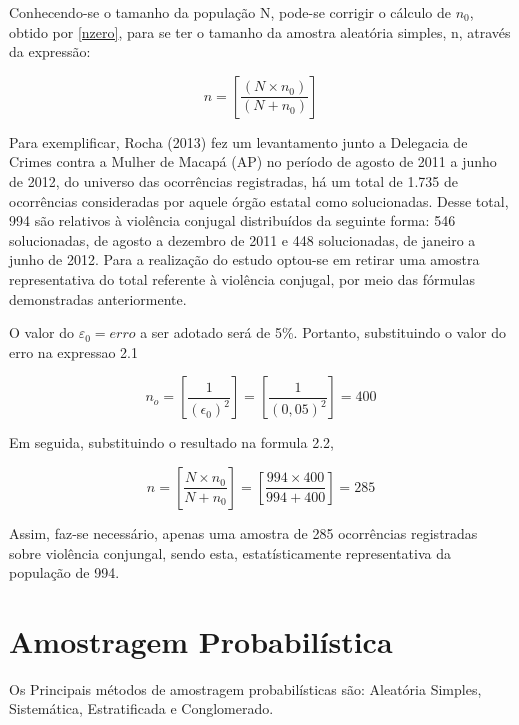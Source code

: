 \newpage
Conhecendo-se o tamanho da população N, pode-se corrigir o cálculo de $n_{0}$, obtido por \ref{nzero}, para se ter o tamanho da amostra aleatória simples, n, através da expressão:


\begin{equation}\label{nzero2}
    n= \left[ \frac{\left(N \times n_{0}\right)}{\left(N + n_{0}\right)} \right]
\end{equation}


Para exemplificar, Rocha (2013) fez um levantamento junto a Delegacia de Crimes contra a Mulher de Macapá (AP) no  período de agosto de 2011 a junho de 2012, do universo das ocorrências registradas, há um total de 1.735 de ocorrências consideradas por
aquele órgão estatal como solucionadas. Desse total, 994 são relativos à violência conjugal distribuídos da seguinte forma: 546 solucionadas, de agosto a dezembro de 2011 e 448 solucionadas, de janeiro a junho de 2012. Para a realização do estudo optou-se em retirar uma amostra representativa do total referente à violência conjugal, por meio das fórmulas demonstradas anteriormente. \vskip0.3cm


O valor do $\varepsilon_{0}=erro$ a ser adotado será de 5\%.
Portanto, substituindo o valor do erro na expressao 2.1

\begin{equation}\label{nzero}
    n_{o}= \left[ \frac{1}{\left(\epsilon_{0}\right)^2} \right] = \left[ \frac{1}{\left(0,05
    \right)^2} \right]= 400
\end{equation}

Em seguida, substituindo o resultado na formula 2.2,

\begin{equation}\label{nzero2}
    n=\left[\frac{N \times n_{0}}{N + n_{0}}\right]=
    \left[\frac{994 \times 400}{994 + 400}\right]=285
\end{equation}

Assim, faz-se necessário, apenas uma amostra de 285 ocorrências
registradas sobre violência conjungal, sendo esta,
estatísticamente representativa da população de 994.



\newpage
\section{Amostragem Probabilística}
Os Principais métodos de amostragem probabilísticas são: Aleatória Simples, Sistemática, Estratificada e Conglomerado.

